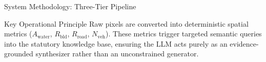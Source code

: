 \documentclass[aspectratio=169, 10pt, professionalfonts]{beamer}
\begin{document}
\begin{frame}{System Methodology: Three-Tier Pipeline}
\begin{center}
  \end{center}
  \vspace{-0.5em}
  \begin{block}{Key Operational Principle}
    \footnotesize
    Raw pixels are converted into deterministic spatial metrics ($A_{\text{water}}$, $R_{\text{bld}}$, $R_{\text{road}}$, $N_{\text{veh}}$). These metrics trigger targeted semantic queries into the statutory knowledge base, ensuring the LLM acts purely as an evidence-grounded synthesizer rather than an unconstrained generator.
  \end{block}
\end{frame}
\end{document}
